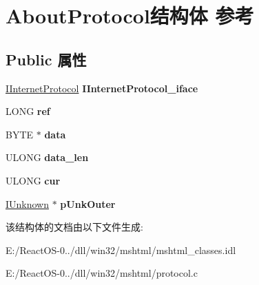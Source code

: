 \hypertarget{class_about_protocol}{}\section{About\+Protocol结构体 参考}
\label{class_about_protocol}
\subsection*{Public 属性}
\begin{DoxyCompactItemize}
\item 
\mbox{\label{class_about_protocol_a0257714cf22e8030deab1d68b2351f0f}} 
\hyperlink{interface_i_internet_protocol}{I\+Internet\+Protocol} {\bfseries I\+Internet\+Protocol\+\_\+iface}
\item 
\mbox{\label{class_about_protocol_ae1cd6b90f21c6b4506056c8c0b1a3906}} 
L\+O\+NG {\bfseries ref}
\item 
\mbox{\label{class_about_protocol_aaf5f62ea369d87f8d85702b1fb7814ea}} 
B\+Y\+TE $\ast$ {\bfseries data}
\item 
\mbox{\label{class_about_protocol_a39f9b1559ba4631aa7a77eef0be9e3db}} 
U\+L\+O\+NG {\bfseries data\+\_\+len}
\item 
\mbox{\label{class_about_protocol_a2f73790963364cd2bf8b0ae592f73853}} 
U\+L\+O\+NG {\bfseries cur}
\item 
\mbox{\label{class_about_protocol_ac08522eebc85c4e7c4728b879627a947}} 
\hyperlink{interface_i_unknown}{I\+Unknown} $\ast$ {\bfseries p\+Unk\+Outer}
\end{DoxyCompactItemize}


该结构体的文档由以下文件生成\+:\begin{DoxyCompactItemize}
\item 
E\+:/\+React\+O\+S-\/0../dll/win32/mshtml/mshtml\+\_\+classes.\+idl\item 
E\+:/\+React\+O\+S-\/0../dll/win32/mshtml/protocol.\+c\end{DoxyCompactItemize}
